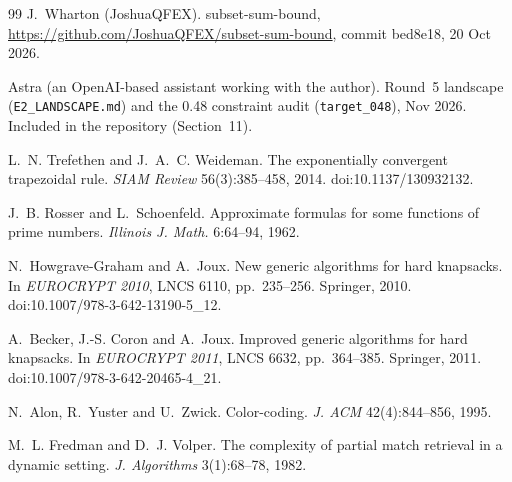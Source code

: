 \documentclass[11pt]{article}
\theoremstyle{plain}
\begin{document}
\begin{thebibliography}{99}
J.~Wharton (JoshuaQFEX). subset-sum-bound, \url{https://github.com/JoshuaQFEX/subset-sum-bound}, commit bed8e18, 20 Oct 2026.

Astra (an OpenAI-based assistant working with the author). Round~5 landscape (\texttt{E2\_LANDSCAPE.md}) and the 0.48 constraint audit (\texttt{target\_048}), Nov 2026. Included in the repository (Section~11).

L.~N. Trefethen and J.~A.~C. Weideman. The exponentially convergent trapezoidal rule. \emph{SIAM Review} 56(3):385--458, 2014. doi:10.1137/130932132.

J.~B. Rosser and L.~Schoenfeld. Approximate formulas for some functions of prime numbers. \emph{Illinois J. Math.} 6:64--94, 1962.

N.~Howgrave-Graham and A.~Joux. New generic algorithms for hard knapsacks. In \emph{EUROCRYPT 2010}, LNCS 6110, pp.~235--256. Springer, 2010. doi:10.1007/978-3-642-13190-5\_12.

A.~Becker, J.-S. Coron and A.~Joux. Improved generic algorithms for hard knapsacks. In \emph{EUROCRYPT 2011}, LNCS 6632, pp.~364--385. Springer, 2011. doi:10.1007/978-3-642-20465-4\_21.

N.~Alon, R.~Yuster and U.~Zwick. Color-coding. \emph{J. ACM} 42(4):844--856, 1995.

M.~L. Fredman and D.~J. Volper. The complexity of partial match retrieval in a dynamic setting. \emph{J. Algorithms} 3(1):68--78, 1982.

\end{thebibliography}
\end{document}
